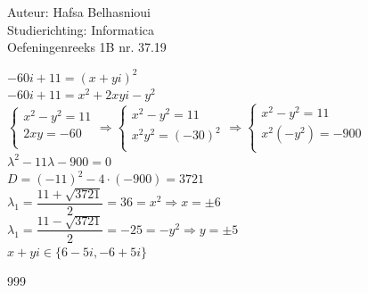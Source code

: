 \documentclass[a4paper]{article}
\begin{document}
\noindent \large Auteur: Hafsa Belhasnioui\\
\noindent \large Studierichting: Informatica\\
\noindent \large Oefeningenreeks 1B nr. 37.19\\

\medskip

\normalsize

$-60i + 11 = (x + yi)^2$\\

$-60i + 11 = x^2 + 2xyi - y^2$\\

$\left \{
\begin{array}{l}
x^2 - y^2 = 11 \\
2xy = -60 \\ %
\end{array}
\right.
\Rightarrow \left \{
\begin{array}{l}
x^2 - y^2 = 11 \\
x^2y^2 = (-30)^2 \\
\end{array}
\right.
\Rightarrow \left \{
\begin{array}{l}
x^2 - y^2 = 11 \\
x^2(-y^2) = -900 \\
\end{array}
\right.$ \\

$\lambda^2 - 11\lambda - 900 = 0$ \\

$D = (-11)^2 - 4 \cdot (-900) = 3721$ \\

$\lambda_{1} = \dfrac{11 + \sqrt{3721}}{2} = 36 = x^2 \Rightarrow x = \pm 6$\\
  
$\lambda_{1} = \dfrac{11 - \sqrt{3721}}{2} = -25 = -y^2 \Rightarrow y = \pm 5$\\

$x + yi \in \{6 - 5i, -6+5i \}$ \\


\begin{thebibliography}{999}
\end{thebibliography}
\end{document}
